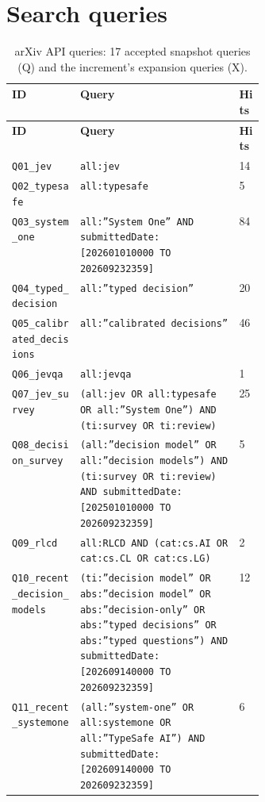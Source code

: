 \section{Search queries}\label{sec:appendix-a-search-queries}

{\footnotesize
\begin{xltabular}{\linewidth}{>{\raggedright\arraybackslash}p{0.27\linewidth}Xp{0.1\linewidth}}
\caption{arXiv API queries: 17 accepted snapshot queries (Q) and the increment’s expansion queries (X).}\label{tab:queries}\\
\toprule
\textbf{ID} & \textbf{Query} & \textbf{Hits} \\
\midrule
\endfirsthead
\toprule
\textbf{ID} & \textbf{Query} & \textbf{Hits} \\
\midrule
\endhead
\texttt{\footnotesize Q01\_jev} & \texttt{\footnotesize all:jev} & 14 \\
\texttt{\footnotesize Q02\_typesafe} & \texttt{\footnotesize all:typesafe} & 5 \\
\texttt{\footnotesize Q03\_system\_one} & \texttt{\footnotesize all:”System One” AND submittedDate:[202601010000 TO 202609232359]} & 84 \\
\texttt{\footnotesize Q04\_typed\_decision} & \texttt{\footnotesize all:”typed decision”} & 20 \\
\texttt{\footnotesize Q05\_calibrated\_decisions} & \texttt{\footnotesize all:”calibrated decisions”} & 46 \\
\texttt{\footnotesize Q06\_jevqa} & \texttt{\footnotesize all:jevqa} & 1 \\
\texttt{\footnotesize Q07\_jev\_survey} & \texttt{\footnotesize (all:jev OR all:typesafe OR all:”System One”) AND (ti:survey OR ti:review)} & 25 \\
\texttt{\footnotesize Q08\_decision\_survey} & \texttt{\footnotesize (all:”decision model” OR all:”decision models”) AND (ti:survey OR ti:review) AND submittedDate:[202501010000 TO 202609232359]} & 5 \\
\texttt{\footnotesize Q09\_rlcd} & \texttt{\footnotesize all:RLCD AND (cat:cs.AI OR cat:cs.CL OR cat:cs.LG)} & 2 \\
\texttt{\footnotesize Q10\_recent\_decision\_models} & \texttt{\footnotesize (ti:”decision model” OR abs:”decision model” OR abs:”decision-only” OR abs:”typed decisions” OR abs:”typed questions”) AND submittedDate:[202609140000 TO 202609232359]} & 12 \\
\texttt{\footnotesize Q11\_recent\_systemone} & \texttt{\footnotesize (all:”system-one” OR all:systemone OR all:”TypeSafe AI”) AND submittedDate:[202609140000 TO 202609232359]} & 6 \\

\end{xltabular}}
